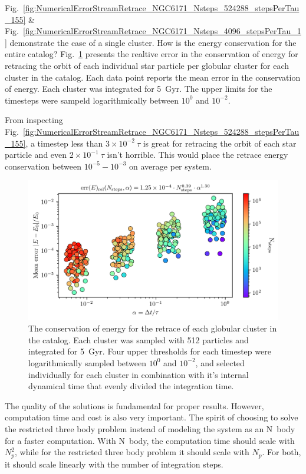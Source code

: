         Fig.~\ref{fig:NumericalErrorStreamRetrace_NGC6171_Nsteps_524288_stepsPerTau_155} \& Fig.~\ref{fig:NumericalErrorStreamRetrace_NGC6171_Nsteps_4096_stepsPerTau_1} demonstrate the case of a single cluster. How is the energy conservation for the entire catalog? Fig.~\ref{fig:NumericalErrorStreamRetraceEnergyConservation} presents the realtive error in the conservation of energy for retracing the orbit of each individual star particle per globular cluster for each cluster in the catalog. Each data point reports the mean error in the conservation of energy. Each cluster was integrated for 5~Gyr. The upper limits for the timesteps were sampeld logarithmically between $10^{0}$ and $10^{-2}$. 

        From inspecting Fig.~\ref{fig:NumericalErrorStreamRetrace_NGC6171_Nsteps_524288_stepsPerTau_155}, a timestep less than $3\times10^{-2}~\tau$ is great for retracing the orbit of each star particle and even $2\times10^{-1}~\tau$ isn't horrible. This would place the retrace energy conservation between $10^{-5}-10^{-3}$ on average per system. 
        \begin{figure}
            \centering 
            \includegraphics[width=\linewidth]{images/NumericalErrorStreamRetraceEnergyConservation.png}
            \caption{The conservation of energy for the retrace of each globular cluster in the catalog. Each cluster was sampled with 512 particles and integrated for 5~Gyr. Four upper thresholds for each timestep were logarithmically sampled between $10^{0}$ and $10^{-2}$, and selected individually for each cluster in combination with it's internal dynamical time that evenly divided the integration time. }
            \label{fig:NumericalErrorStreamRetraceEnergyConservation}
        \end{figure}

        The quality of the solutions is fundamental for proper results. However, computation time and cost is also very important. The spirit of choosing to solve the restricted three body problem instead of modeling the system as an N~body for a faster computation. With N~body, the computation time should scale with $N_p^2$, while for the restricted three body problem it should scale with $N_p$. For both, it should scale linearly with the number of integration steps. 

